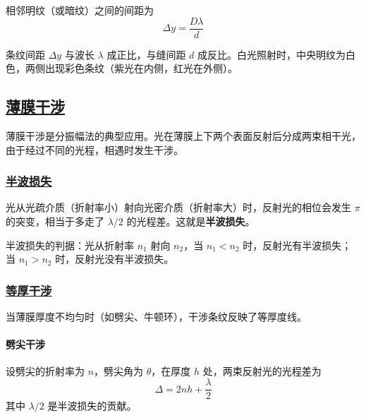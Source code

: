 \begin{definition}[条纹间距]
    相邻明纹（或暗纹）之间的间距为
    \begin{equation}
        \Delta y = \frac{D\lambda}{d}
    \end{equation}
\end{definition}

\begin{remark}
    条纹间距 $\Delta y$ 与波长 $\lambda$ 成正比，与缝间距 $d$ 成反比。白光照射时，中央明纹为白色，两侧出现彩色条纹（紫光在内侧，红光在外侧）。
\end{remark}

\subsection{\protect\hyperlink{:}{薄膜干涉}}

薄膜干涉是分振幅法的典型应用。光在薄膜上下两个表面反射后分成两束相干光，由于经过不同的光程，相遇时发生干涉。

\subsubsection{\protect\hyperlink{:}{半波损失}}

\begin{definition}[半波损失]
    光从光疏介质（折射率小）射向光密介质（折射率大）时，反射光的相位会发生 $\pi$ 的突变，相当于多走了 $\lambda/2$ 的光程差。这就是\textbf{半波损失}。
\end{definition}

半波损失的判据：光从折射率 $n_1$ 射向 $n_2$，当 $n_1 < n_2$ 时，反射光有半波损失；当 $n_1 > n_2$ 时，反射光没有半波损失。

\subsubsection{\protect\hyperlink{:}{等厚干涉}}

当薄膜厚度不均匀时（如劈尖、牛顿环），干涉条纹反映了等厚度线。

\paragraph*{劈尖干涉}

\begin{definition}[劈尖干涉的光程差]
    设劈尖的折射率为 $n$，劈尖角为 $\theta$，在厚度 $h$ 处，两束反射光的光程差为
    \begin{equation}
        \Delta = 2nh + \frac{\lambda}{2}
    \end{equation}
    其中 $\lambda/2$ 是半波损失的贡献。
\end{definition}

